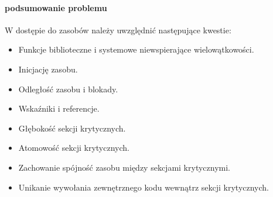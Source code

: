 \paragraph{podsumowanie problemu}
W dostępie do zasobów należy uwzględnić następujące kwestie:
\begin{itemize}
\item Funkcje biblioteczne i systemowe niewspierające wielowątkowości.
\item Inicjację zasobu.
\item Odległość zasobu i blokady.
\item Wskaźniki i referencje.
\item Głębokość sekcji krytycznych.
\item Atomowość sekcji krytycznych.
\item Zachowanie spójność zasobu między sekcjami krytycznymi.
\item Unikanie wywołania zewnętrznego kodu wewnątrz sekcji krytycznych.
\end{itemize}
